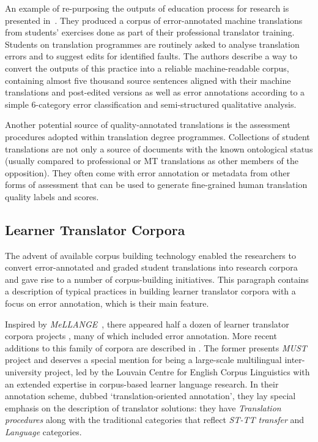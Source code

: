 An example of re-purposing the outputs of education process for research is presented in~\citet{Wisniewski2014}. They produced a corpus of error-annotated machine translations from students' exercises done as part of their professional translator training. Students on translation programmes are routinely asked to analyse translation errors and to suggest edits for identified faults. The authors describe a way to convert the outputs of this practice into a reliable machine-readable corpus, containing almost five thousand source sentences aligned with their machine translations and post-edited versions as well as error annotations according to a simple 6-category error classification and semi-structured qualitative analysis.

Another potential source of quality-annotated translations is the assessment procedures adopted within translation degree programmes. Collections of student translations are not only a source of documents with the known ontological status (usually compared to professional or MT translations as other members of the opposition). They often come with error annotation or metadata from other forms of assessment that can be used to generate fine-grained human translation quality labels and scores.

\subsection{\label{ssec:ltc}Learner Translator Corpora}

The advent of available corpus building technology enabled the researchers to convert error-annotated and graded student translations into research corpora and gave rise to a number of corpus-building initiatives.
This paragraph contains a description of typical practices in building learner translator corpora with a focus on error annotation, which is their main feature.

Inspired by \textit{MeLLANGE}~\cite{Castagnoli2011b}, there appeared half a dozen of learner translator corpora projects \cite{Wurm2013, Lapshinova2013, Stepankova2014, Espunya2014, Kutuzov2014rltc,Fictumova2017}, many of which included error annotation. More recent additions to this family of corpora are described in \citet{Granger2018,Alfuraih2019}. The former presents \textit{MUST} project and deserves a special mention for being a large-scale multilingual inter-university project, led by the Louvain Centre for English Corpus Linguistics with an extended expertise in corpus-based learner language research. In their annotation scheme, dubbed `translation-oriented annotation', they lay special emphasis on the description of translator solutions: they have \textit{Translation procedures} along with the traditional categories that reflect \textit{ST-TT transfer} and \textit{Language} categories. 

